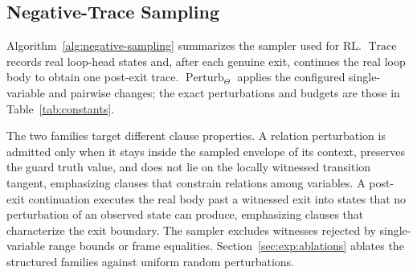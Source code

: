 \subsection{Negative-Trace Sampling}
\label{app:negative-sampling}



Algorithm~\ref{alg:negative-sampling} summarizes the sampler used for RL.
\(\operatorname{Trace}\) records real loop-head states and, after each genuine
exit, continues the real loop body to obtain one post-exit trace.
\(\operatorname{Perturb}_{\Theta}\) applies the configured single-variable and
pairwise changes; the exact perturbations and budgets are those in
Table~\ref{tab:constants}.

The two families target different clause properties.  A
relation perturbation is admitted only when it stays inside the sampled
envelope of its context, preserves the guard truth value, and does not lie on
the locally witnessed transition tangent, emphasizing clauses that constrain
relations among variables.  A post-exit continuation executes the real body
past a witnessed exit into states that no perturbation of an observed state
can produce, emphasizing clauses that characterize the exit boundary.  The
sampler excludes witnesses rejected by single-variable range bounds or frame
equalities.  Section~\ref{sec:exp:ablations} ablates the structured families
against uniform random perturbations.

